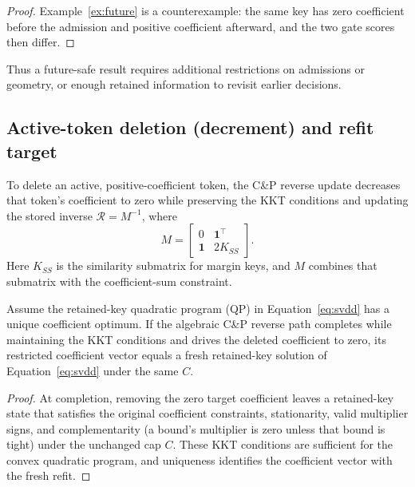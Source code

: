 \begin{proof}
Example~\ref{ex:future} is a counterexample: the same key has zero coefficient
before the admission and positive coefficient afterward, and the two gate
scores then differ.
\end{proof}

Thus a future-safe result requires additional restrictions on admissions or
geometry, or enough retained information to revisit earlier decisions.

\subsection{Active-token deletion (decrement) and refit target}\label{sec:increment}

To delete an active, positive-coefficient token, the C\&P reverse update
decreases that token's coefficient to zero while preserving the KKT conditions
and updating the stored inverse \(\mathcal{R}=M^{-1}\), where
\begin{equation}
M=
\begin{bmatrix}
0 & \mathbf{1}^\top\\
\mathbf{1} & 2K_{SS}
\end{bmatrix}.
\end{equation}
Here \(K_{SS}\) is the similarity submatrix for margin keys, and \(M\) combines
that submatrix with the coefficient-sum constraint.

\begin{proposition}\label{prop:decrement}
Assume the retained-key quadratic program (QP) in
Equation~\ref{eq:svdd} has a unique coefficient optimum. If the algebraic C\&P
reverse path completes while maintaining the KKT conditions and drives the
deleted coefficient to zero, its restricted coefficient vector equals a fresh
retained-key solution of Equation~\ref{eq:svdd} under the same \(C\).
\end{proposition}

\begin{proof}
At completion, removing the zero target coefficient leaves a retained-key state
that satisfies the original coefficient constraints, stationarity, valid
multiplier signs, and complementarity (a bound's multiplier is zero unless that
bound is tight) under the unchanged cap \(C\). These KKT conditions are
sufficient for the convex quadratic program, and uniqueness identifies the
coefficient vector with the fresh refit.
\end{proof}

